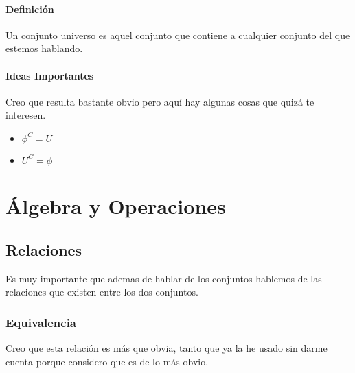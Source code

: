 \documentclass[12pt]{report}                                    %
\begin{document}
        \subsubsection*{Definición}
        Un conjunto universo es aquel conjunto que contiene a cualquier conjunto del que estemos hablando.


        \subsubsection*{Ideas Importantes}
        Creo que resulta bastante obvio pero aquí hay algunas cosas que quizá te interesen.
        \begin{itemize}
            \item $\phi^C = U$
            \item $U^C = \phi$
        \end{itemize}





\chapter{Álgebra y Operaciones}
    \clearpage


    \clearpage
    \section{Relaciones}

        Es muy importante que ademas de hablar de los conjuntos hablemos de las relaciones
        que existen entre los dos conjuntos.


        \subsection{Equivalencia}

            Creo que esta relación es más que obvia, tanto que ya la he usado sin darme cuenta
            porque considero que es de lo más obvio.
\end{document}
